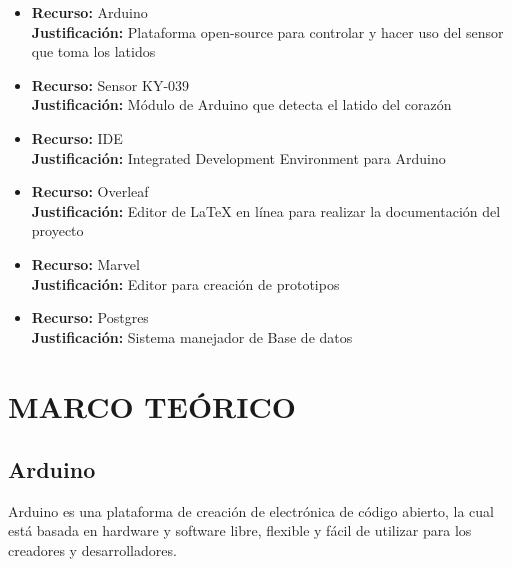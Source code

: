 \documentclass[letterpaper, 10 pt, conference]{ieeeconf}  %
\begin{document}
\begin{itemize}

    \item 
        \textbf{Recurso:} Arduino\\
        \textbf{Justificaci\'on:} Plataforma open-source para controlar y hacer uso del sensor que toma los latidos\\
        
    \item 
        \textbf{Recurso:} Sensor KY-039\\
        \textbf{Justificaci\'on:} M\'odulo de Arduino que detecta el latido del coraz\'on\\
        
    \item 
        \textbf{Recurso:} IDE\\
        \textbf{Justificaci\'on:} Integrated Development Environment para Arduino\\
        
    \item 
        \textbf{Recurso:} Overleaf\\
        \textbf{Justificaci\'on:} Editor de LaTeX en l\'inea para realizar la documentaci\'on del proyecto\\
    
    \item 
        \textbf{Recurso:} Marvel\\
        \textbf{Justificaci\'on:} Editor para creaci\'on de prototipos\\
        
     \item 
        \textbf{Recurso:} Postgres\\
        \textbf{Justificaci\'on:} Sistema manejador de Base de datos\\
        
\end{itemize}

\section{MARCO TE\'ORICO}

\subsection{Arduino}

Arduino es una plataforma de creaci\'on de electr\'onica de c\'odigo abierto, la cual est\'a basada en hardware y software libre, flexible y f\'acil de utilizar para los creadores y desarrolladores. 
\end{document}
